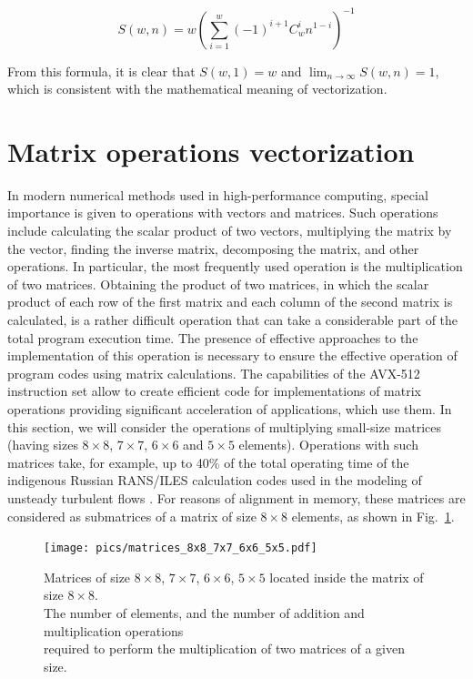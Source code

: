 \documentclass[
11pt,%
tightenlines,%
twoside,%
onecolumn,%
nofloats,%
nobibnotes,%
nofootinbib,%
superscriptaddress,%
noshowpacs,%
centertags]%
{revtex4}
\begin{document}
\begin{equation}
S(w, n) = w \left( \sum_{i = 1}^{w}{(-1)^{i + 1} C_{w}^{i} n^{1 - i}} \right)^{-1}
\end{equation}

From this formula, it is clear that $S(w, 1) = w$ and $\lim_{n \to \infty}{S(w, n)} = 1$, which is consistent with the mathematical meaning of vectorization.

\section{Matrix operations vectorization}

In modern numerical methods used in high-performance computing, special importance is given to operations with vectors and matrices.
Such operations include calculating the scalar product of two vectors, multiplying the matrix by the vector, finding the inverse matrix, decomposing the matrix, and other operations.
In particular, the most frequently used operation is the multiplication of two matrices.
Obtaining the product of two matrices, in which the scalar product of each row of the first matrix and each column of the second matrix is calculated, is a rather difficult operation that can take a considerable part of the total program execution time.
The presence of effective approaches to the implementation of this operation is necessary to ensure the effective operation of program codes using matrix calculations.
The capabilities of the AVX-512 instruction set allow to create efficient code for implementations of matrix operations providing significant acceleration of  applications, which use them.
In this section, we will consider the operations of multiplying small-size matrices (having sizes $8 \times 8$, $7 \times 7$, $6 \times 6$ and $5 \times 5$ elements).
Operations with such matrices take, for example, up to 40\% of the total operating time of the indigenous Russian RANS/ILES calculation codes used in the modeling of unsteady turbulent flows \cite{Lyub_RANS_ILES, Ben_Lyub_Chest_RANS_ILES}.
For reasons of alignment in memory, these matrices are considered as submatrices of a matrix of size $8 \times 8$ elements, as shown in Fig.~\ref{fig:matrices_8x8_7x7_6x6_5x5}.

\begin{figure}[h]
\setcaptionmargin{5mm}
\onelinecaptionsfalse %
\texttt{[image: pics/matrices\_8x8\_7x7\_6x6\_5x5.pdf]}
\caption{Matrices of size $8 \times 8$, $7 \times 7$, $6 \times 6$, $5 \times 5$ located inside the matrix of size $8 \times 8$. \\ The number of elements, and the number of addition and multiplication operations \\ required to perform the multiplication of two matrices of a given size.}\label{fig:matrices_8x8_7x7_6x6_5x5}
\end{figure}
\end{document}
